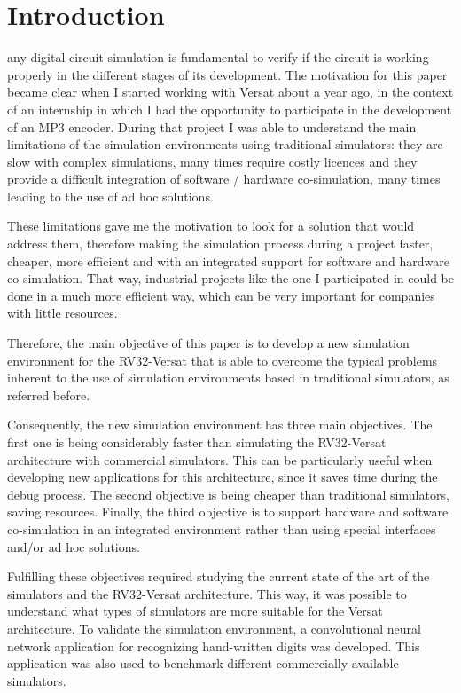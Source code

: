 \documentclass[conference]{IEEEtran}
\begin{document}
\section{Introduction}
 any digital circuit simulation is fundamental to verify if the 
circuit is working properly in the different stages of its development. The motivation for
this paper became clear when I started working with Versat about a year ago, in
the context of an internship in which I had the opportunity to participate in
the development of an MP3 encoder. During that project I was able to understand
the main limitations of the simulation environments using traditional
simulators: they are slow with complex simulations, many times require costly
licences and they provide a difficult integration of software / hardware
co-simulation, many times leading to the use of ad hoc solutions.

These limitations gave me the motivation to look for a solution that would
address them, therefore making the simulation process during a project faster,
cheaper, more efficient and with an integrated support for software and hardware
co-simulation. That way, industrial projects like the one I participated in
could be done in a much more efficient way, which can be very important for
companies with little resources.

Therefore, the main objective of this paper is to develop a new simulation environment 
for the RV32-Versat that is able to overcome the typical problems inherent to the use of
simulation environments based in traditional simulators, as referred before.

Consequently, the new simulation environment has three main objectives. The
first one is being considerably faster than simulating the RV32-Versat
architecture with commercial simulators. This can be particularly useful when
developing new applications for this architecture, since it saves time during
the debug process. The second objective is being cheaper than traditional
simulators, saving resources. Finally, the third objective is to support
hardware and software co-simulation in an integrated environment rather than
using special interfaces and/or ad hoc solutions.

Fulfilling these objectives required studying the current state of the art of
the simulators and the RV32-Versat architecture. This way, it was possible to
understand what types of simulators are more suitable for the Versat
architecture. To validate the simulation environment, a convolutional neural
network application for recognizing hand-written digits was developed.
This application was also used to benchmark different commercially
available simulators.
\end{document}
